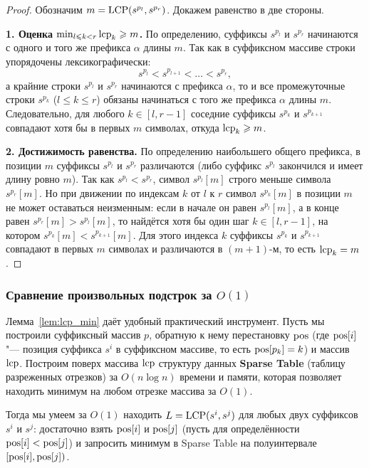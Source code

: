 \begin{proof}
    Обозначим $m = \operatorname{LCP}(s^{p_l}, s^{p_r})$. Докажем равенство в две стороны.

    \textbf{1. Оценка $\min_{l \leqslant k < r} \operatorname{lcp}_k \geqslant m$.} По определению, суффиксы $s^{p_l}$ и $s^{p_r}$ начинаются с одного и того же префикса $\alpha$ длины $m$. Так как в суффиксном массиве строки упорядочены лексикографически:
    \[
        s^{p_l} < s^{p_{l+1}} < \dots < s^{p_r},
    \]
    а крайние строки $s^{p_l}$ и $s^{p_r}$ начинаются с префикса $\alpha$, то и все промежуточные строки $s^{p_k}$ ($l \le k \le r$) обязаны начинаться с того же префикса $\alpha$ длины $m$. Следовательно, для любого $k \in [l, r-1]$ соседние суффиксы $s^{p_k}$ и $s^{p_{k+1}}$ совпадают хотя бы в первых $m$ символах, откуда $\operatorname{lcp}_k \geqslant m$.

    \textbf{2. Достижимость равенства.} По определению наибольшего общего префикса, в позиции $m$ суффиксы $s^{p_l}$ и $s^{p_r}$ различаются (либо суффикс $s^{p_l}$ закончился и имеет длину ровно $m$). Так как $s^{p_l} < s^{p_r}$, символ $s^{p_l}[m]$ строго меньше символа $s^{p_r}[m]$. Но при движении по индексам $k$ от $l$ к $r$ символ $s^{p_k}[m]$ в позиции $m$ не может оставаться неизменным: если в начале он равен $s^{p_l}[m]$, а в конце равен $s^{p_r}[m] > s^{p_l}[m]$, то найдётся хотя бы один шаг $k \in [l, r-1]$, на котором $s^{p_k}[m] < s^{p_{k+1}}[m]$. Для этого индекса $k$ суффиксы $s^{p_k}$ и $s^{p_{k+1}}$ совпадают в первых $m$ символах и различаются в $(m+1)$-м, то есть $\operatorname{lcp}_k = m$.
\end{proof}

\subsubsection{Сравнение произвольных подстрок за \texorpdfstring{$O(1)$}{O(1)}}

Лемма~\ref{lem:lcp_min} даёт удобный практический инструмент. Пусть мы построили суффиксный массив $p$, обратную к нему перестановку $\operatorname{pos}$ (где $\operatorname{pos}[i]$ "--- позиция суффикса $s^i$ в суффиксном массиве, то есть $\operatorname{pos}[p_k] = k$) и массив $\operatorname{lcp}$. Построим поверх массива $\operatorname{lcp}$ структуру данных \textbf{Sparse Table} (таблицу разреженных отрезков) за $O(n \log n)$ времени и памяти, которая позволяет находить минимум на любом отрезке массива за $O(1)$.

Тогда мы умеем за $O(1)$ находить $L = \operatorname{LCP}(s^i, s^j)$ для любых двух суффиксов $s^i$ и $s^j$: достаточно взять $\operatorname{pos}[i]$ и $\operatorname{pos}[j]$ (пусть для определённости $\operatorname{pos}[i] < \operatorname{pos}[j]$) и запросить минимум в Sparse Table на полуинтервале $[\operatorname{pos}[i], \operatorname{pos}[j])$.

